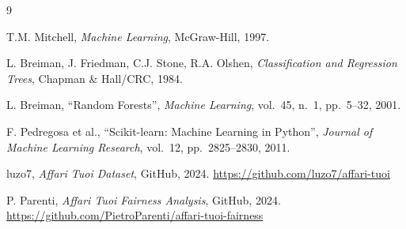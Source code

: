 \documentclass[12pt, a4paper]{article}
\begin{document}
\begin{thebibliography}{9}

  T.M. Mitchell,
  \textit{Machine Learning},
  McGraw-Hill, 1997.

  L. Breiman, J. Friedman, C.J. Stone, R.A. Olshen,
  \textit{Classification and Regression Trees},
  Chapman \& Hall/CRC, 1984.

  L. Breiman,
  ``Random Forests'',
  \textit{Machine Learning}, vol.~45, n.~1, pp.~5--32, 2001.

  F. Pedregosa et al.,
  ``Scikit-learn: Machine Learning in Python'',
  \textit{Journal of Machine Learning Research}, vol.~12, pp.~2825--2830, 2011.

  luzo7,
  \textit{Affari Tuoi Dataset},
  GitHub, 2024.
  \url{https://github.com/luzo7/affari-tuoi}

  P. Parenti,
  \textit{Affari Tuoi Fairness Analysis},
  GitHub, 2024.
  \url{https://github.com/PietroParenti/affari-tuoi-fairness}

\end{thebibliography}
\end{document}
